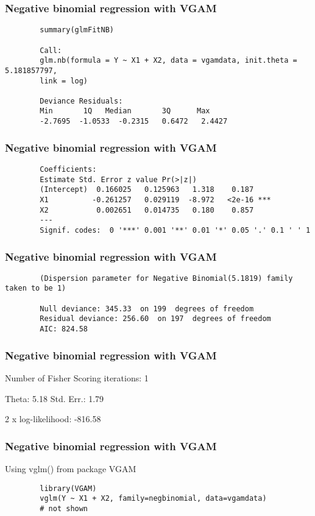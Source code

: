 \documentclass{beamer}
\begin{document}
	\begin{frame}[fragile]
		\frametitle{Negative binomial regression with VGAM}
		\begin{verbatim}
		summary(glmFitNB)
		
		Call:
		glm.nb(formula = Y ~ X1 + X2, data = vgamdata, init.theta = 5.181857797, 
		link = log)
		
		Deviance Residuals: 
		Min       1Q   Median       3Q      Max  
		-2.7695  -1.0533  -0.2315   0.6472   2.4427  
		\end{verbatim}
	\end{frame}
	\begin{frame}[fragile]
		\frametitle{Negative binomial regression with VGAM}
		\begin{verbatim}
		Coefficients:
		Estimate Std. Error z value Pr(>|z|)    
		(Intercept)  0.166025   0.125963   1.318    0.187    
		X1          -0.261257   0.029119  -8.972   <2e-16 ***
		X2           0.002651   0.014735   0.180    0.857    
		---
		Signif. codes:  0 '***' 0.001 '**' 0.01 '*' 0.05 '.' 0.1 ' ' 1
		\end{verbatim}
	\end{frame}
	\begin{frame}[fragile]
		\frametitle{Negative binomial regression with VGAM}
		\begin{verbatim}
		(Dispersion parameter for Negative Binomial(5.1819) family taken to be 1)
		
		Null deviance: 345.33  on 199  degrees of freedom
		Residual deviance: 256.60  on 197  degrees of freedom
		AIC: 824.58
		\end{verbatim}
	\end{frame}
	\begin{frame}[fragile]
		\frametitle{Negative binomial regression with VGAM}
		Number of Fisher Scoring iterations: 1
		
		Theta:  5.18 
		Std. Err.:  1.79 
		
		2 x log-likelihood:  -816.58 
	\end{frame}
	\begin{frame}[fragile]
		\frametitle{Negative binomial regression with VGAM}
		Using vglm() from package VGAM
		\begin{verbatim}
		library(VGAM)
		vglm(Y ~ X1 + X2, family=negbinomial, data=vgamdata)
		# not shown
		\end{verbatim}
		
		
	\end{frame}
\end{document}
